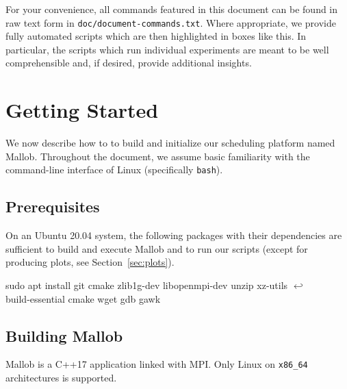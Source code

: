 \documentclass[runningheads]{article}
\newcommand{\CR}{{\tiny$\hookleftarrow$}}
\numberwithin{dummy}{subsection}
\begin{document}
\begin{tcolorbox}[
  colback=Magenta!5!white,
  colframe=Magenta!75!black,
  title={\centering Commands and Scripts}]
For your convenience, all commands featured in this document can be found in raw text form in \texttt{doc/document-commands.txt}.
Where appropriate, we provide fully automated scripts which are then highlighted in boxes like this.
In particular, the scripts which run individual experiments are meant to be well comprehensible and, if desired, provide additional insights.
\end{tcolorbox}





\section{Getting Started}

We now describe how to to build and initialize our scheduling platform named Mallob.
Throughout the document, we assume basic familiarity with the command-line interface of Linux (specifically \texttt{bash}).

\subsection{Prerequisites}
\label{sec:prerequisites}

On an Ubuntu 20.04 system, the following packages with their dependencies are sufficient to build and execute Mallob and to run our scripts (except for producing plots, see Section~\ref{sec:plots}).

\begin{ttfenv}
sudo apt install git cmake zlib1g-dev libopenmpi-dev unzip xz-utils \CR\\
\hspace*{0.3cm}build-essential cmake wget gdb gawk
\end{ttfenv}






\subsection{Building Mallob}

Mallob is a C++17 application linked with MPI. Only Linux on \texttt{x86\_64} architectures is supported.
\end{document}
